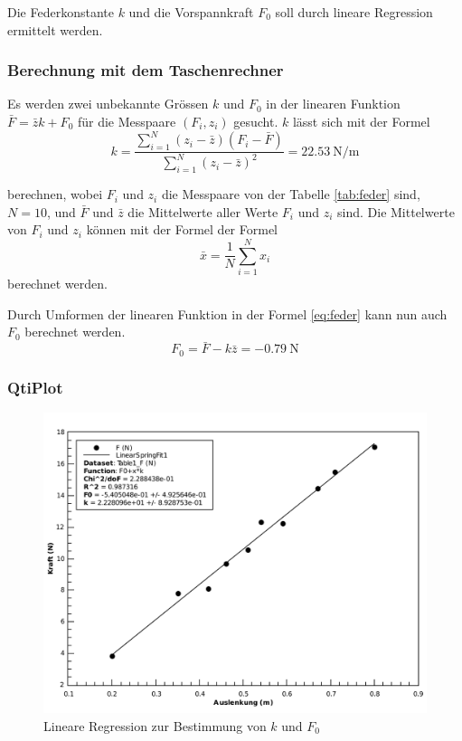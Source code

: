 Die Federkonstante $k$ und die Vorspannkraft $F_0$ soll durch lineare Regression ermittelt werden.


\subsubsection*{Berechnung mit dem Taschenrechner}

Es werden zwei unbekannte Gr\"ossen $k$ und $F_0$ in der linearen Funktion $\bar{F}=\bar{z}k+F_0$
f\"ur die Messpaare $(F_i, z_i)$ gesucht. $k$ l\"asst sich mit der Formel
\begin{equation}
    k = \frac{ \sum_{i=1}^{N} (z_i - \bar{z}) (F_i - \bar{F})}{ \sum_{i=1}^{N} (z_i - \bar{z})^2} = \SI{22.53}{\newton\per\meter}
    \label{eq:k}
\end{equation}

berechnen, wobei $F_i$ und $z_i$ die Messpaare von der Tabelle \ref{tab:feder} sind, $N=10$, und
$\bar{F}$ und $\bar{z}$ die Mittelwerte aller Werte $F_i$ und $z_i$ sind. Die Mittelwerte von
$F_i$ und $z_i$ k\"onnen mit der Formel
der Formel
\begin{equation}
    \bar{x} = \frac{1}{N} \sum_{i=1}^{N} x_i
    \label{eq:mittelwert}
\end{equation}
berechnet werden.

Durch Umformen der linearen Funktion in der Formel \ref{eq:feder} kann nun auch $F_0$ berechnet
werden.
\begin{equation}
    F_0 = \bar{F} - k\bar{z} = \SI{-0.79}{\newton}
\end{equation}


\subsubsection*{QtiPlot}

\begin{figure}[H]
    \center
    \includegraphics[width=.8\textwidth]{qtiplot/feder-linear}
    \caption{Lineare Regression zur Bestimmung von $k$ und $F_0$}
    \label{fig:feder-linear}
\end{figure}

